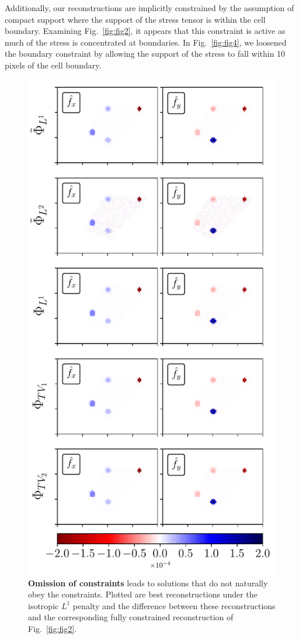 \documentclass[aps,prl,reprint,twocolumn,groupedaddress,showpacs]{revtex4-1}
\begin{document}
Additionally, our reconstructions are implicitly constrained by the assumption of compact support where
the support of the stress tensor is within the cell boundary. Examining Fig.~\ref{fig:fig2}, it appears that 
this constraint is active as much of the stress is concentrated at boundaries. In Fig.~\ref{fig:fig4}, we 
loosened the boundary constraint by allowing the support of the stress to fall within 10 pixels of the cell boundary. 

\begin{figure}
\includegraphics[width=\linewidth]{fig3}
\caption{\textbf{Omission of constraints} leads to solutions that do not naturally obey the constraints. Plotted are best reconstructions under the isotropic $L^1$ penalty and the difference between these reconstructions and the corresponding fully constrained reconstruction of Fig.~\ref{fig:fig2}. }
\label{fig:fig3}
\end{figure}
\end{document}
